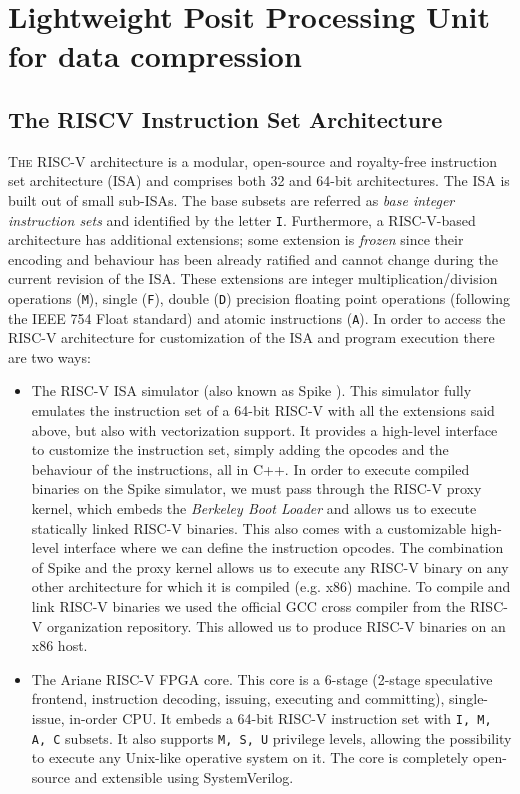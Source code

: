 \chapter{Lightweight Posit Processing Unit for data compression}\label{chap:posit_hw}




\section{The RISCV Instruction Set Architecture}

\lettrine{T}{he} RISC-V \cite{riscvisa} architecture is a modular, open-source and royalty-free instruction set architecture (ISA) and comprises both 32 and 64-bit architectures. The ISA is built out of small sub-ISAs. The base subsets are referred as \textit{base integer instruction sets} and identified by the letter \texttt{I}. Furthermore, a RISC-V-based architecture has additional extensions; some extension is \textit{frozen} since their encoding and behaviour has been already ratified and cannot change during the current revision of the ISA. These extensions are integer multiplication/division operations (\texttt{M}), single (\texttt{F}), double (\texttt{D}) precision floating point operations (following the IEEE 754 Float standard) and atomic instructions (\texttt{A}). In order to access the RISC-V architecture for customization of the ISA and program execution there are two ways:
\begin{itemize}
    \item The RISC-V ISA simulator (also known as Spike \cite{riscvisasim}). This simulator fully emulates the instruction set of a 64-bit RISC-V with all the extensions said above, but also with vectorization support. It provides a high-level interface to customize the instruction set, simply adding the opcodes and the behaviour of the instructions, all in C++. In order to execute compiled binaries on the Spike simulator, we must pass through the RISC-V proxy kernel, which embeds the \textit{Berkeley Boot Loader} and allows us to execute statically linked RISC-V binaries. This also comes with a customizable high-level interface where we can define the instruction opcodes. The combination of Spike and the proxy kernel allows us to execute any RISC-V binary on any other architecture for which it is compiled (e.g. x86) machine. To compile and link RISC-V binaries we used the official GCC cross compiler from the RISC-V organization repository. This allowed us to produce RISC-V binaries on an x86 host.
    \item The Ariane RISC-V FPGA core. This core is a 6-stage (2-stage speculative frontend, instruction decoding, issuing, executing and committing), single-issue, in-order CPU. It embeds a 64-bit RISC-V instruction set with \texttt{I, M, A, C} subsets. It also supports \texttt{M, S, U} privilege levels, allowing the possibility to execute any Unix-like operative system on it. The core is completely open-source and extensible using SystemVerilog.
\end{itemize}

